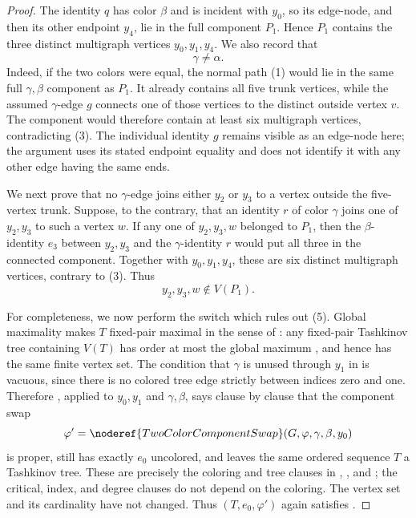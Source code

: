 \begin{proof}
The identity $q$ has color $\beta$ and is incident with $y_0$, so its
edge-node, and then its other endpoint $y_4$, lie in the full component
$P_1$.  Hence $P_1$ contains the three distinct multigraph vertices
$y_0,y_1,y_4$.  We also record that
\[
 \gamma\ne\alpha.                                   \tag{4}
\]
Indeed, if the two colors were equal, the normal path (1) would lie in the
same full $\gamma,\beta$ component as $P_1$.  It already contains all five
trunk vertices, while the assumed $\gamma$-edge $g$ connects one of those
vertices to the distinct outside vertex $v$.  The component would therefore
contain at least six multigraph vertices, contradicting (3).  The
individual identity $g$ remains visible as an edge-node here; the argument
uses its stated endpoint equality and does not identify it with any other
edge having the same ends.

We next prove that no $\gamma$-edge joins either $y_2$ or $y_3$ to a
vertex outside the five-vertex trunk.  Suppose, to the contrary, that an
identity $r$ of color $\gamma$ joins one of $y_2,y_3$ to such a vertex
$w$.  If any one of $y_2,y_3,w$ belonged to $P_1$, then the
$\beta$-identity $e_3$ between $y_2,y_3$ and the $\gamma$-identity $r$
would put all three in the connected component.  Together with
$y_0,y_1,y_4$, these are six distinct multigraph vertices, contrary to
(3).  Thus
\[
 y_2,y_3,w\notin V(P_1).                             \tag{5}
\]

For completeness, we now perform the switch which rules out (5).  Global
maximality makes $T$ fixed-pair maximal in the sense of
: any fixed-pair Tashkinov tree
containing $V(T)$ has order at most the global maximum
, and hence has the same finite vertex set.  The
condition that $\gamma$ is unused through $y_1$ in
 is vacuous, since there is no colored tree
edge strictly between indices zero and one.  Therefore
, applied to $y_0,y_1$ and
$\gamma,\beta$, says clause by clause that the component swap
\[
 \varphi'=\noderef{TwoColorComponentSwap}
   (G,\varphi,\gamma,\beta,y_0)
\]
is proper, still has exactly $e_0$ uncolored, and leaves the same ordered
sequence $T$ a Tashkinov tree.  These are precisely the coloring and tree
clauses in , , and
; the critical, index, and degree clauses do not
depend on the coloring.  The vertex set and its cardinality have not
changed.  Thus
$(T,e_0,\varphi')$ again satisfies .


\end{proof}
